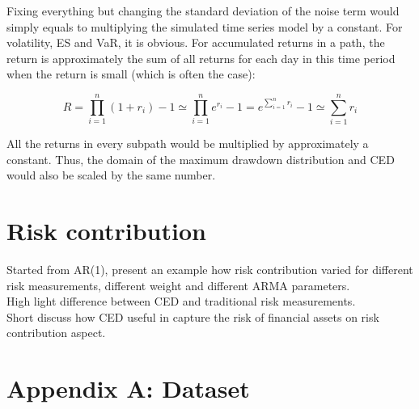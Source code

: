 \documentclass[11pt]{article}
\begin{document}
Fixing everything but changing the standard deviation of the noise term would simply equals to multiplying the simulated time series model by a constant. For volatility, ES and VaR, it is obvious. For accumulated returns in a path, the return is approximately the sum of all returns for each day in this time period when the return is small (which is often the case):

\begin{equation}
R = \prod_{i=1}^n (1+r_i) - 1 \simeq \prod_{i=1}^n e^{r_i} - 1 = e^{\sum_{i=1}^n r_i} - 1 
 \simeq  \sum_{i=1}^n r_i
\end{equation}

All the returns in every subpath would be multiplied by approximately a constant. Thus, the domain of the maximum drawdown distribution and CED would also be scaled by the same number.

\section{Risk contribution}
Started from AR(1), present an example how risk contribution varied for different risk measurements, different weight and different ARMA parameters.\\

High light difference between CED and traditional risk measurements.\\

Short discuss how CED useful in capture the risk of financial assets on risk contribution aspect.


\clearpage

\newpage
\appendix
\section{Appendix A: Dataset} \label{App:AppendixA}
\end{document}
